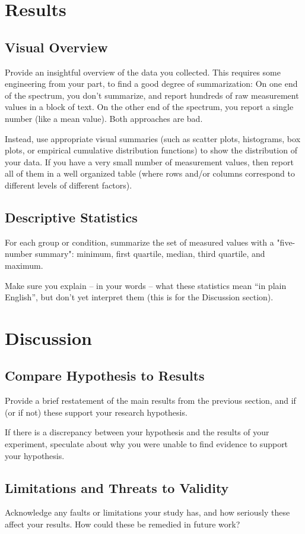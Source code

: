 \documentclass{article}
\begin{document}
\section{Results}
\subsection{Visual Overview}
Provide an insightful overview of the data you collected. This requires some engineering from your part, to find a good degree of summarization: On one end of the spectrum, you don't summarize, and report hundreds of raw measurement values in a block of text. On the other end of the spectrum, you report a single number (like a mean value). Both approaches are bad.

Instead, use appropriate visual summaries (such as scatter plots, histograms, box plots, or empirical cumulative distribution functions) to show the distribution of your data. If you have a very small number of measurement values, then report all of them in a well organized table (where rows and/or columns correspond to different levels of different factors).

\subsection{Descriptive Statistics}
For each group or condition, summarize the set of measured values with a "five-number summary": minimum, first quartile, median, third quartile, and maximum. 

Make sure you explain – in your words – what these statistics mean “in plain English”, but don’t yet interpret them (this is for the Discussion section).

\section{Discussion}
\subsection{Compare Hypothesis to Results}
Provide a brief restatement of the main results from the previous section, and if (or if not) these support your research hypothesis.

If there is a discrepancy between your hypothesis and the results of your experiment, speculate about why you were unable to find evidence to support your hypothesis. 


\subsection{Limitations and Threats to Validity}
Acknowledge any faults or limitations your study has, and how seriously these affect your
results. How could these be remedied in future work?
\end{document}
